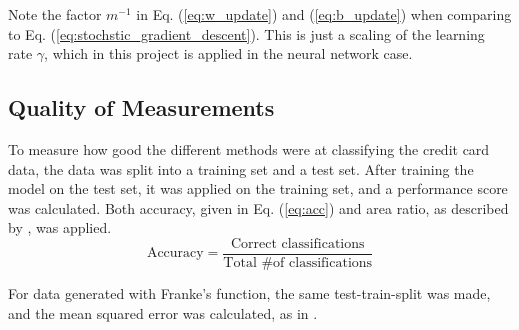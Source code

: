 Note the factor $m^{-1}$ in Eq. (\ref{eq:w_update}) and (\ref{eq:b_update}) when comparing to Eq. (\ref{eq:stochstic_gradient_descent}). This is just a scaling of the learning rate $\gamma$, which in this project is applied in the neural network case.

\subsection{Quality of Measurements}
To measure how good the different methods were at classifying the credit card data, the data was split into a training set and a test set. After training the model on the test set, it was applied on the training set, and a performance score was calculated. Both accuracy, given in Eq. (\ref{eq:acc}) and area ratio, as described by \cite{yeh2009UCI}, was applied.
\begin{equation}\label{eq:acc}
  \text{Accuracy} = \frac{\text{Correct classifications}}{\text{Total \# of classifications}}
\end{equation}

For data generated with Franke's function, the same test-train-split was made, and the mean squared error was calculated, as in \cite{prosjekt1}.
